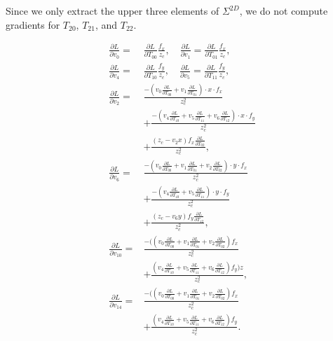 Since we only extract the upper three elements of $\Sigma^{2D}$, we do not compute gradients for $T_{20}$, $T_{21}$, and $T_{22}$.

\begin{equation}
    \begin{aligned}
        \frac{\partial L}{\partial v_0}=&\frac{\partial L}{\partial T_{00}}\frac{f_x}{z_c},
        \quad \frac{\partial L}{\partial v_1}=\frac{\partial L}{\partial T_{01}}\frac{f_x}{z_c},\\
        \frac{\partial L}{\partial v_4}=&\frac{\partial L}{\partial T_{10}}\frac{f_y}{z_c},
        \quad \frac{\partial L}{\partial v_5}=\frac{\partial L}{\partial T_{11}}\frac{f_y}{z_c},\\
        \frac{\partial L}{\partial v_2}=&\frac{-(v_0\frac{\partial L}{\partial T_{00}}+v_1\frac{\partial L}{\partial T_{01}})\cdot x\cdot f_x}{z_c^2}\\
        &+\frac{-(v_4\frac{\partial L}{\partial T_{10}}+v_5\frac{\partial L}{\partial T_{11}}+v_6\frac{\partial L}{\partial T_{12}})\cdot x\cdot f_y}{z_c^2}\\
        &+\frac{(z_c-v_2x)f_x\frac{\partial L}{\partial T_{02}}}{z_c^2},\\
        \frac{\partial L}{\partial v_6}=&\frac{-(v_0\frac{\partial L}{\partial T_{00}}+v_1\frac{\partial L}{\partial T_{01}}+v_2\frac{\partial L}{\partial T_{02}})\cdot y\cdot f_x}{z_c^2}\\
        &+\frac{-(v_4\frac{\partial L}{\partial T_{10}}+v_5\frac{\partial L}{\partial T_{11}})\cdot y\cdot f_y}{z_c^2}\\
        &+\frac{(z_c-v_6y)f_y\frac{\partial L}{\partial T_{12}}}{z_c^2},\\ 
        \frac{\partial L}{\partial v_{10}}=&\frac{-((v_0\frac{\partial L}{\partial T_{00}}+v_1\frac{\partial L}{\partial T_{01}}+v_2\frac{\partial L}{\partial T_{02}})f_x}{z_c^2}\\
        &+\frac{(v_4\frac{\partial L}{\partial T_{10}}+v_5\frac{\partial L}{\partial T_{11}}+v_6\frac{\partial L}{\partial T_{12}})f_y)z}{z_c^2},\\
        \frac{\partial L}{\partial v_{14}}=&\frac{-((v_0\frac{\partial L}{\partial T_{00}}+v_1\frac{\partial L}{\partial T_{01}}+v_2\frac{\partial L}{\partial T_{02}})f_x}{z_c^2}\\
        &+\frac{(v_4\frac{\partial L}{\partial T_{10}}+v_5\frac{\partial L}{\partial T_{11}}+v_6\frac{\partial L}{\partial T_{12}})f_y}{z_c^2}.
    \end{aligned}
\end{equation}

